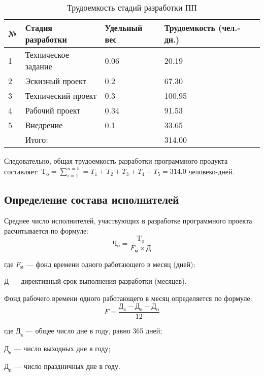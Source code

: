 \begin{par}
\begin{table}
\caption{Трудоемкость стадий разработки ПП}
\begin{tabular}{|l|p{7cm}|p{4cm}|p{4cm}|}
\hline{}
№ & Стадия разработки & Удельный вес & Трудоемкость (чел.- дн.) \\
\hline{}
1 & Техническое задание & 0.06 &  20.19 \\
\hline{}
2 & Эскизный проект & 0.2 & 67.30 \\
\hline{}
3 & Технический проект & 0.3 & 100.95 \\
\hline{}
4 & Рабочий проект & 0.34 & 91.53 \\
\hline{}
5 & Внедрение & 0.1 & 33.65 \\
\hline{}
& Итого: & & 314.00  \\
\hline
\end{tabular}
\label{table:trdSoftDev}
\end{table}
Следовательно, общая трудоемкость разработки программного продукта
составляет: $\textrm{T}_{\textrm{o}} = \sum_{i=1}^{n=5} = T_1 + T_2 + T_3 + T_4 + T_5 = 314.0$ человеко-дней.
\end{par}


\subsection{Определение состава исполнителей}
Среднее число исполнителей, участвующих в разработке программного проекта расчитывается по формуле:
\begin{equation}
    \textrm{Ч}_{\textrm{и}} =\frac{\textrm{T}_{\textrm{o}}}{F_{\textrm{м}}\times{}\textrm{Д}}
\end{equation}
\begin{ESKDexplanation}
    \item[где ]{} $F_{\textrm{м}}$ --- фонд времени одного работающего в месяц (дней);
    \item{} $\textrm{Д}$ --- директивный срок выполнения разработки (месяцев).
\end{ESKDexplanation}
Фонд рабочего времени одного работающего в месяц определяется по формуле:
\begin{equation}
    F = \frac{ \textrm{Д}_{\textrm{к}} - \textrm{Д}_{\textrm{в}} - \textrm{Д}_{\textrm{п}}   }{12}
\end{equation}
\begin{ESKDexplanation}
    \item[где ]{} $\textrm{Д}_{\textrm{к}}$ --- общее число дне в году, равно 365 дней;
    \item{} $\textrm{Д}_{\textrm{в}}$ --- число выходных дне в году;
    \item{} $\textrm{Д}_{\textrm{п}}$ --- число праздничных дне в году.
\end{ESKDexplanation}



